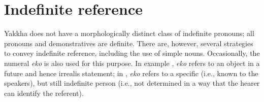 \begin{table}[htp]
{\small
{}
}
\end{table}

	

\section{Indefinite reference}\label{sec-indef}

Yakkha does not have a morphologically distinct class of indefinite pronouns; all pronouns and demonstratives are definite. There are, however,  several strategies to convey indefinite reference, including the use of simple nouns. Occasionally, the numeral \emph{eko}  is also used for this purpose. In example \Next[a], \emph{eko} refers to an object in a future and hence irrealis statement; in \Next[b], \emph{eko} refers to a specific (i.e., known to the speakers), but still indefinite person (i.e., not determined in a way that the hearer can identify the referent).

